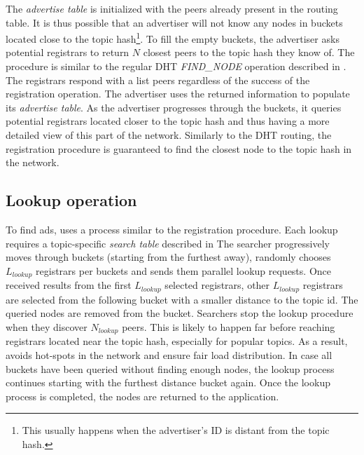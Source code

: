 The \emph{advertise table} is initialized with the peers already present in the routing table. It is thus possible that an advertiser will not know any nodes in buckets located close to the topic hash\footnote{This usually happens when the advertiser's ID is distant from the topic hash.}. 
To fill the empty buckets, the advertiser asks potential registrars to return $N$ closest peers to the topic hash they know of. 
The procedure is similar to the regular DHT \emph{FIND\_NODE} operation described in . 
The registrars respond with a list peers regardless of the success of the registration operation. 
The advertiser uses the returned information to populate its \emph{advertise table}. 
As the advertiser progresses through the buckets, it queries potential registrars located closer to the topic hash and thus having a more detailed view of this part of the network. 
Similarly to the DHT routing, the registration procedure is guaranteed to find the closest node to the topic hash in the network. 


\subsection{Lookup operation}\label{sec:lookup}
To find ads, \sysname uses a process similar to the registration procedure. 
Each lookup requires a topic-specific \emph{search table} described in 
The searcher progressively moves through buckets (starting from the furthest away), randomly chooses $L_\textit{lookup}$ registrars per buckets and sends them parallel lookup requests. 
Once received results from the first $L_\textit{lookup}$ selected registrars,  other $L_\textit{lookup}$ registrars are selected from the  following bucket with a smaller distance to the topic id.
The queried nodes are removed from the bucket.
Searchers stop the lookup procedure when they discover $N_\textit{lookup}$ peers. This is likely to happen far before reaching registrars located near the topic hash, especially for popular topics. As a result, \sysname avoids hot-spots in the network and ensure fair load distribution. 
In case all buckets have been queried without finding enough nodes, the lookup process continues starting with the furthest distance bucket again. 
Once the lookup process is completed, the nodes are returned to the application.

